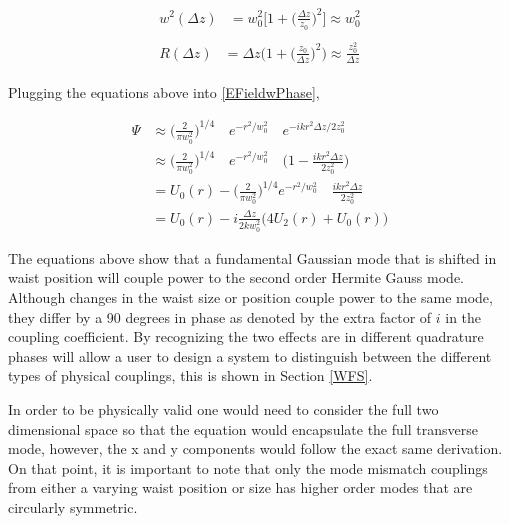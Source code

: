 \documentclass[oneside]{book}
\begin{document}
		\begin{subequations}
		\begin{align}
		\begin{split}
			w^2(\Delta z)	&= 	w^2_0 \bigg[1 + \bigg(\frac{\Delta z}{z_0}  \bigg)^2 \bigg]  \approx	w^2_0
		\end{split}\\
		\begin{split}
			R(\Delta z) 	&=	\Delta z \bigg(1 + \bigg(\frac{z_0}{\Delta z}\bigg)^2\bigg) \approx	\frac{z_0^2}{\Delta z}
		\end{split}
		\end{align}
		\end{subequations}

		Plugging the equations above into \ref{EFieldwPhase},
		
		\begin{equation}
		\begin{aligned}
		\Psi 	&\approx	\bigg( \frac{2}{\pi w_0^2} \bigg)^{1/4} \quad e^{-r^2/w_0^2} \quad e^{-ikr^2 \Delta z /2 z_0^2}
		\\		&\approx	\bigg( \frac{2}{\pi w_0^2} \bigg)^{1/4} \quad e^{-r^2/w_0^2} \quad \bigg( 1-\frac{ikr^2 \Delta z}{2 z_0^2}  \bigg)
		\\		&=			U_0(r) - \bigg( \frac{2}{\pi w_0^2} \bigg)^{1/4} e^{-r^2/w_0^2} \quad \frac{ikr^2 \Delta z}{2 z_0^2}
		\\		&=			U_0(r) - i \frac{\Delta z}{2k w_0^2} \bigg( 4U_2(r) + U_0(r) \bigg)
		\end{aligned}
		\end{equation}
		
		The equations above show that a fundamental Gaussian mode that is shifted in waist position will couple power to the second order Hermite Gauss mode.  Although changes in the waist size or position couple power to the same mode, they differ by a 90 degrees in phase as denoted by the extra factor of $i$ in the coupling coefficient.  By recognizing the two effects are in different quadrature phases will allow a user to design a system to distinguish between the different types of physical couplings, this is shown in Section \ref{WFS}.
		
		 In order to be physically valid one would need to consider the full two dimensional space so that the equation would encapsulate the full transverse mode, however, the x and y components would follow the exact same derivation. On that point, it is important to note that only the mode mismatch couplings from either a varying waist position or size has higher order modes that are circularly symmetric.
		
\end{document}
